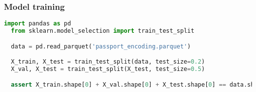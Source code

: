 \subsubsection{Model training}

\begin{lstlisting}[language=Python, caption=Dataset splitting]
  import pandas as pd
  from sklearn.model_selection import train_test_split

  data = pd.read_parquet('passport_encoding.parquet')

  X_train, X_test = train_test_split(data, test_size=0.2)
  X_val, X_test = train_test_split(X_test, test_size=0.5)

  assert X_train.shape[0] + X_val.shape[0] + X_test.shape[0] == data.shape[0]
\end{lstlisting}

